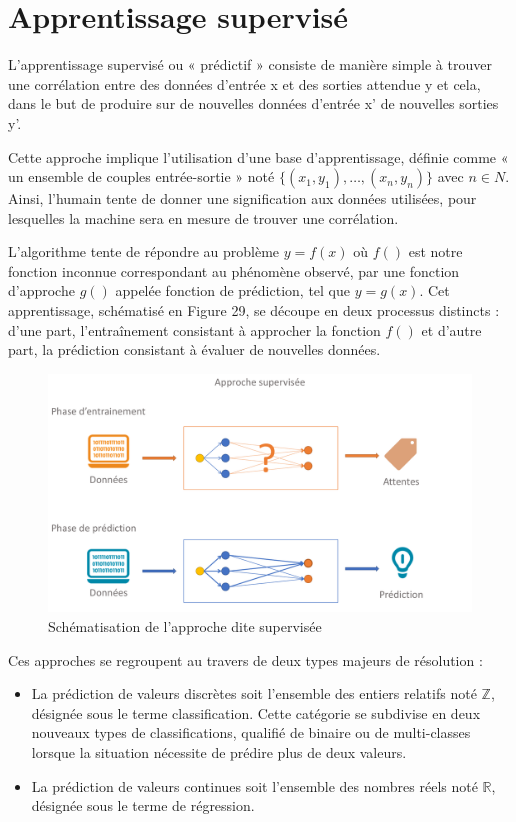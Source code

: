 \section*{Apprentissage supervisé}
L’apprentissage supervisé ou « prédictif » consiste de manière simple à trouver une corrélation entre des données d’entrée x et des sorties attendue y et cela, dans le but de produire sur de nouvelles données d’entrée x' de nouvelles sorties y'.\par
Cette approche implique l’utilisation d’une base d’apprentissage, définie comme « un ensemble de couples entrée-sortie » noté $\{(x_1,y_1 ),…,(x_n,y_n )\}$ avec $n \in N$. Ainsi, l’humain tente de donner une signification aux données utilisées, pour lesquelles la machine sera en mesure de trouver une corrélation.\par
L’algorithme tente de répondre au problème $y=f(x)$ où $f()$ est notre fonction inconnue correspondant au phénomène observé, par une fonction d’approche $g()$ appelée fonction de prédiction, tel que $y=g(x)$.
Cet apprentissage, schématisé en Figure 29, se découpe en deux processus distincts : d’une part, l’entraînement consistant à approcher la fonction $f()$ et d’autre part, la prédiction consistant à évaluer de nouvelles données.\par
  
\begin{figure}[H]
    \centering
    \includegraphics[width=\linewidth]{contents/chapter_3/resources/SupervisedClassification.pdf}
    \caption{Schématisation de l’approche dite supervisée}
    \label{fig:chapter_3:supervised_classification}
\end{figure}

Ces approches se regroupent au travers de deux types majeurs de résolution :
\begin{itemize}
    \item La prédiction de valeurs discrètes soit l’ensemble des entiers relatifs noté $\pmb{\mathbb{Z}}$, désignée sous le terme classification. Cette catégorie se subdivise en deux nouveaux types de classifications, qualifié de binaire ou de multi-classes lorsque la situation nécessite de prédire plus de deux valeurs.
    \item La prédiction de valeurs continues soit l’ensemble des nombres réels noté $\pmb{\mathbb{R}}$, désignée sous le terme de régression.
\end{itemize}\par
	
